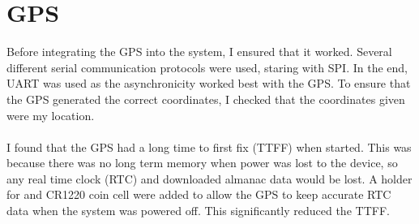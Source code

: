 \documentclass[12pt,a4paper]{report}
\begin{document}
\section{GPS} 
Before integrating the GPS into the system, I ensured that it worked. Several different serial communication protocols were used, staring with SPI. In the end, UART was used as the asynchronicity worked best with the GPS. To ensure that the GPS generated the correct coordinates, I checked that the coordinates given were my location. \\ \\ 
I found that the GPS had a long time to first fix (TTFF) when started. This was because there was no long term memory when power was lost to the device, so any real time clock (RTC) and downloaded almanac data would be lost. A holder for and CR1220 coin cell were added to allow the GPS to keep accurate RTC data when the system was powered off. This significantly reduced the TTFF. 
\end{document}
